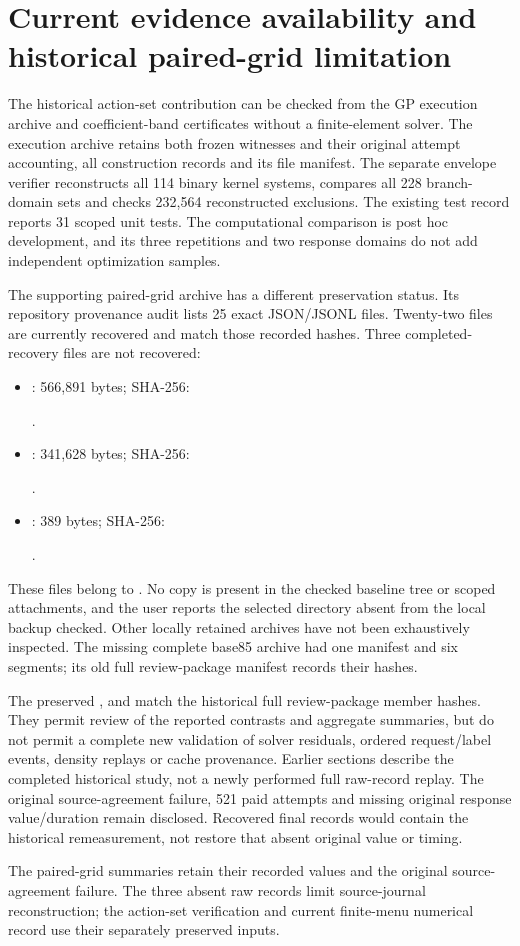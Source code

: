 \section{Current evidence availability and historical paired-grid limitation}\label{supp:current_availability}

The historical action-set contribution can be checked from the GP execution archive and coefficient-band certificates without a finite-element solver. The execution archive retains both frozen witnesses and their original attempt accounting, all construction records and its file manifest. The separate envelope verifier reconstructs all 114 binary kernel systems, compares all 228 branch-domain sets and checks 232,564 reconstructed exclusions. The existing test record reports 31 scoped unit tests. The computational comparison is post hoc development, and its three repetitions and two response domains do not add independent optimization samples.

The supporting paired-grid archive has a different preservation status. Its repository provenance audit lists 25 exact JSON/JSONL files. Twenty-two files are currently recovered and match those recorded hashes. Three completed-recovery files are not recovered:
\begin{itemize}
\item {}: 566,891 bytes; SHA-256:\par
{\footnotesize{}}.
\item {}: 341,628 bytes; SHA-256:\par
{\footnotesize{}}.
\item {}: 389 bytes; SHA-256:\par
{\footnotesize{}}.
\end{itemize}
These files belong to . No copy is present in the checked baseline tree or scoped attachments, and the user reports the selected directory absent from the local backup checked. Other locally retained archives have not been exhaustively inspected. The missing complete base85 archive had one manifest and six segments; its old full review-package manifest records their hashes.

The preserved ,  and  match the historical full review-package member hashes. They permit review of the reported contrasts and aggregate summaries, but do not permit a complete new validation of solver residuals, ordered request/label events, density replays or cache provenance. Earlier sections describe the completed historical study, not a newly performed full raw-record replay. The original source-agreement failure, 521 paid attempts and missing original response value/duration remain disclosed. Recovered final records would contain the historical remeasurement, not restore that absent original value or timing.

The paired-grid summaries retain their recorded values and the original source-agreement failure. The three absent raw records limit source-journal reconstruction; the action-set verification and current finite-menu numerical record use their separately preserved inputs.
